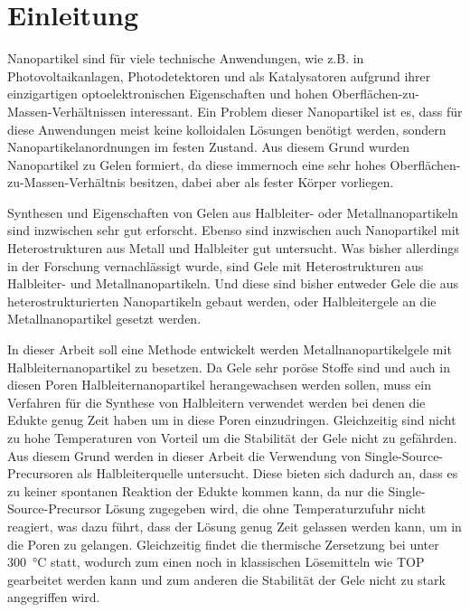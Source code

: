 \section{Einleitung}
Nanopartikel sind für viele technische Anwendungen, wie z.B. in Photovoltaikanlagen, Photodetektoren und als Katalysatoren aufgrund ihrer einzigartigen optoelektronischen Eigenschaften und hohen Oberflächen-zu-Massen-Verhältnissen interessant. 
\autocite{Afzaal2006,Cai2006,Law2005,Yan2003}
Ein Problem dieser Nanopartikel ist es, dass für diese Anwendungen meist keine kolloidalen Lösungen benötigt werden, sondern Nanopartikelanordnungen im festen Zustand.
Aus diesem Grund wurden Nanopartikel zu Gelen formiert, da diese immernoch eine sehr hohes Oberflächen-zu-Massen-Verhältnis besitzen, dabei aber als fester Körper vorliegen.

Synthesen und Eigenschaften von Gelen aus Halbleiter- oder Metallnanopartikeln sind inzwischen sehr gut erforscht.
Ebenso sind inzwischen auch Nanopartikel mit Heterostrukturen aus Metall und Halbleiter gut untersucht.
Was bisher allerdings in der Forschung vernachlässigt wurde, sind Gele mit Heterostrukturen aus Halbleiter- und Metallnanopartikeln.
Und diese sind bisher entweder Gele die aus heterostrukturierten Nanopartikeln gebaut werden,\autocite{Nahar2015,Lesnyak2011} oder Halbleitergele an die Metallnanopartikel gesetzt werden. \autocite{Gill2009,Gill2011}

In dieser Arbeit soll eine Methode entwickelt werden Metallnanopartikelgele mit Halbleiternanopartikel zu besetzen.
Da Gele sehr poröse Stoffe sind und auch in diesen Poren Halbleiternanopartikel herangewachsen werden sollen, muss ein Verfahren für die Synthese von Halbleitern verwendet werden bei denen die Edukte genug Zeit haben um in diese Poren einzudringen.
Gleichzeitig sind nicht zu hohe Temperaturen von Vorteil um die Stabilität der Gele nicht zu gefährden.
Aus diesem Grund werden in dieser Arbeit die Verwendung von Single-Source-Precursoren als Halbleiterquelle untersucht.
Diese bieten sich dadurch an, dass es zu keiner spontanen Reaktion der Edukte kommen kann, da nur die Single-Source-Precursor Lösung zugegeben wird, die ohne Temperaturzufuhr nicht reagiert, was dazu führt, dass der Lösung genug Zeit gelassen werden kann, um in die Poren zu gelangen. 
Gleichzeitig findet die thermische Zersetzung bei unter \SI{300}{\degreeCelsius} statt, wodurch zum einen noch in klassischen Lösemitteln wie TOP gearbeitet werden kann und zum anderen die Stabilität der Gele nicht zu stark angegriffen wird.